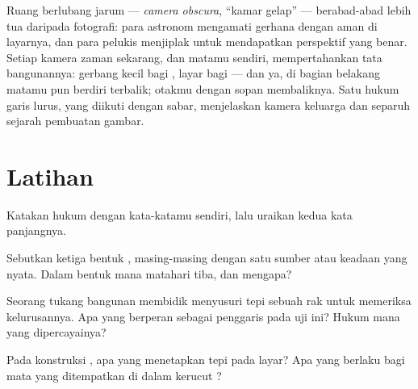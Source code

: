 \begin{remark}\label{rem:g6:light-propagation:history}
Ruang berlubang jarum --- \emph{camera obscura}, ``kamar gelap'' ---
berabad-abad lebih tua daripada fotografi: para astronom mengamati
gerhana dengan aman di layarnya, dan para pelukis menjiplak
 untuk mendapatkan perspektif yang benar. Setiap kamera
zaman sekarang, dan matamu sendiri, mempertahankan tata bangunannya:
gerbang kecil bagi , layar bagi  --- dan ya,
 di bagian belakang matamu pun berdiri terbalik; otakmu dengan
sopan membaliknya. Satu hukum garis lurus, yang diikuti dengan sabar,
menjelaskan kamera keluarga dan separuh sejarah pembuatan gambar.
\end{remark}

\section{Latihan}

\begin{exercise}[$\star$]\label{exo:g6:light-propagation:1}
Katakan hukum  dengan kata-katamu sendiri, lalu
uraikan kedua kata panjangnya.
\end{exercise}

\begin{exercise}[$\star$]\label{exo:g6:light-propagation:2}
Sebutkan ketiga bentuk , masing-masing dengan satu sumber atau
keadaan yang nyata. Dalam bentuk mana  matahari tiba, dan
mengapa?
\end{exercise}

\begin{exercise}[$\star$]\label{exo:g6:light-propagation:3}
Seorang tukang bangunan membidik menyusuri tepi sebuah rak untuk
memeriksa kelurusannya. Apa yang berperan sebagai penggaris pada uji
ini? Hukum mana yang dipercayainya?
\end{exercise}

\begin{exercise}[$\star$]\label{exo:g6:light-propagation:4}
Pada konstruksi , apa yang menetapkan tepi
 pada layar? Apa yang berlaku bagi mata yang
ditempatkan di dalam kerucut ?
\end{exercise}

